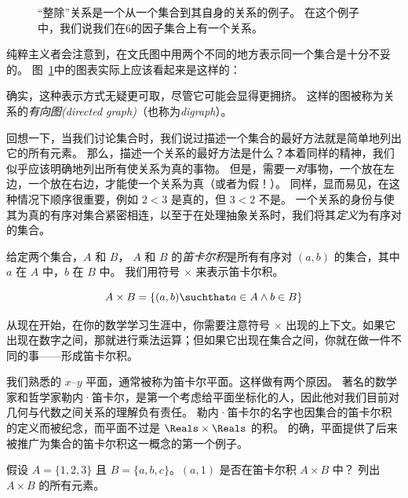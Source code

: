\begin{figure}[!hbtp]

\caption[一个“整除”关系的例子。]{“整除”关系是一个从一个集合到其自身的关系的例子。
在这个例子中，我们说我们在6的因子集合上有一个关系。}
\label{fig:rel2} 
\end{figure}
 
纯粹主义者会注意到，在文氏图中用两个不同的地方表示同一个集合是十分不妥的。
图~\ref{fig:rel2}中的图表实际上应该看起来是这样的：

\begin{center}

\end{center}

确实，这种表示方式无疑更可取，尽管它可能会显得更拥挤。
这样的图被称为关系的\emph{有向图(directed graph)}（也称为\emph{digraph}）。

回想一下，当我们讨论集合时，我们说过描述一个集合的最好方法就是简单地列出它的所有元素。
那么，描述一个关系的最好方法是什么？本着同样的精神，我们似乎应该明确地列出所有使关系为真的事物。
但是，需要一\emph{对}事物，一个放在左边，一个放在右边，才能使一个关系为真（或者为假！）。
同样，显而易见，在这种情况下顺序很重要，例如 $2<3$ 是真的，但 $3<2$ 不是。
一个关系的身份与使其为真的有序对集合紧密相连，以至于在处理抽象关系时，我们将其\emph{定义}为有序对的集合。

给定两个集合，$A$ 和 $B$，
$A$ 和 $B$ 的\emph{笛卡尔积}是所有有序对 $(a,b)$ 的集合，其中 $a$ 在 $A$ 中，$b$ 在 $B$ 中。
我们用符号 $\times$ 来表示笛卡尔积。

\[ A \times B = \{ (a,b) \suchthat a \in A \land b \in B \} \]

\noindent 从现在开始，在你的数学学习生涯中，你需要注意符号 $\times$ 出现的上下文。如果它出现在数字之间，那就进行乘法运算；但如果它出现在集合之间，你就在做一件不同的事——形成笛卡尔积。

我们熟悉的 $x$--$y$ 平面，通常被称为笛卡尔平面。这样做有两个原因。
著名的数学家和哲学家勒内·笛卡尔，是第一个考虑给平面坐标化的人，因此他对我们目前对几何与代数之间关系的理解负有责任。
勒内·笛卡尔的名字也因集合的笛卡尔积的定义而被纪念，而平面不过是 $\Reals \times \Reals$ 的积。
的确，平面提供了后来被推广为集合的笛卡尔积这一概念的第一个例子。

\begin{exer}
假设 $A = \{1,2,3\}$ 且 $B = \{a,b,c\}$。$(a,1)$ 是否在笛卡尔积 $A \times B$ 中？
列出 $A \times B$ 的所有元素。
\end{exer}


